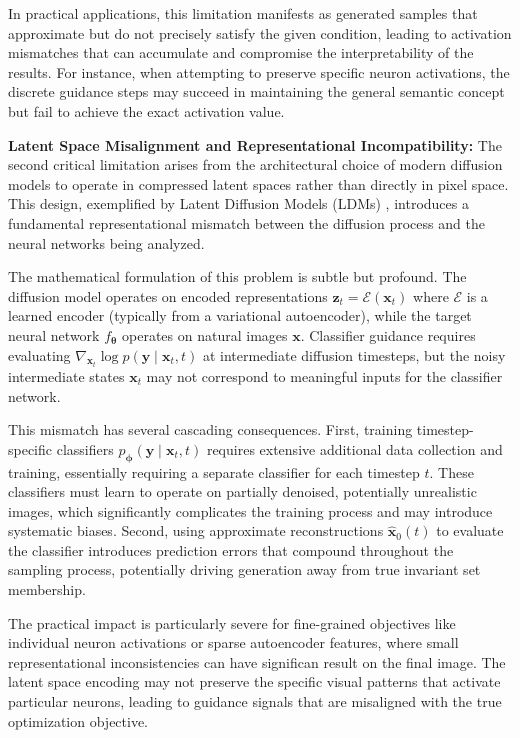 \documentclass[licencjacka,en]{pracamgr}
\begin{document}
In practical applications, this limitation manifests as generated samples that approximate but do not precisely satisfy the given condition, leading to activation mismatches that can accumulate and compromise the interpretability of the results. For instance, when attempting to preserve specific neuron activations, the discrete guidance steps may succeed in maintaining the general semantic concept but fail to achieve the exact activation value.

\textbf{Latent Space Misalignment and Representational Incompatibility:} The second critical limitation arises from the architectural choice of modern diffusion models to operate in compressed latent spaces rather than directly in pixel space. This design, exemplified by Latent Diffusion Models (LDMs) \citep{rombach2022highresolutionimagesynthesislatent}, introduces a fundamental representational mismatch between the diffusion process and the neural networks being analyzed.

The mathematical formulation of this problem is subtle but profound. The diffusion model operates on encoded representations $\mathbf{z}_t = \mathcal{E}(\mathbf{x}_t)$ where $\mathcal{E}$ is a learned encoder (typically from a variational autoencoder), while the target neural network $f_{\boldsymbol{\theta}}$ operates on natural images $\mathbf{x}$. Classifier guidance requires evaluating $\nabla_{\mathbf{x}_t} \log p(\mathbf{y} \mid \mathbf{x}_t, t)$ at intermediate diffusion timesteps, but the noisy intermediate states $\mathbf{x}_t$ may not correspond to meaningful inputs for the classifier network.

This mismatch has several cascading consequences. First, training timestep-specific classifiers $p_{\boldsymbol{\phi}}(\mathbf{y} \mid \mathbf{x}_t, t)$ requires extensive additional data collection and training, essentially requiring a separate classifier for each timestep $t$. These classifiers must learn to operate on partially denoised, potentially unrealistic images, which significantly complicates the training process and may introduce systematic biases. Second, using approximate reconstructions $\hat{\mathbf{x}}_0(t)$ to evaluate the classifier introduces prediction errors that compound throughout the sampling process, potentially driving generation away from true invariant set membership.

The practical impact is particularly severe for fine-grained objectives like individual neuron activations or sparse autoencoder features, where small representational inconsistencies can have significan result on the final image. The latent space encoding may not preserve the specific visual patterns that activate particular neurons, leading to guidance signals that are misaligned with the true optimization objective.
\end{document}
